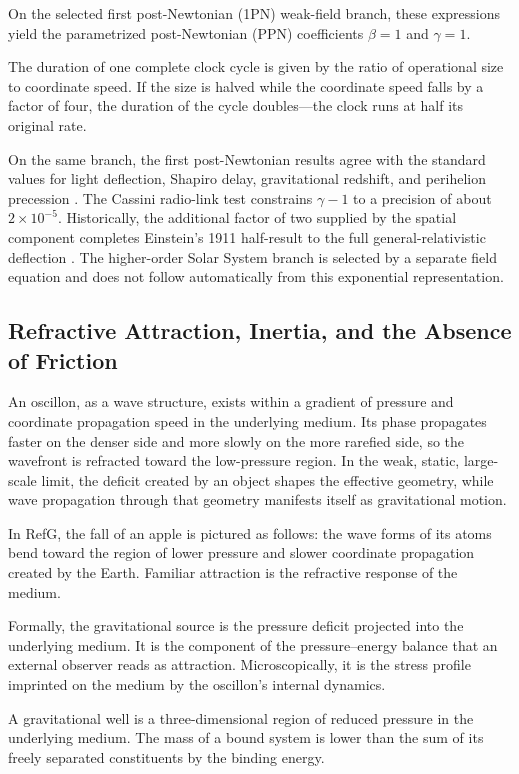 \documentclass[11pt,a4paper]{article}
\begin{document}
On the selected first post-Newtonian (1PN) weak-field branch, these expressions yield the parametrized post-Newtonian (PPN) coefficients $\beta=1$ and $\gamma=1$.

The duration of one complete clock cycle is given by the ratio of operational size to coordinate speed. If the size is halved while the coordinate speed falls by a factor of four, the duration of the cycle doubles---the clock runs at half its original rate.

On the same branch, the first post-Newtonian results agree with the standard values for light deflection, Shapiro delay, gravitational redshift, and perihelion precession \citep{bertotti2003,will2014}. The Cassini radio-link test constrains $\gamma-1$ to a precision of about $2\times10^{-5}$. Historically, the additional factor of two supplied by the spatial component completes Einstein's 1911 half-result to the full general-relativistic deflection \citep{einstein1916,shapiro1964}. The higher-order Solar System branch is selected by a separate field equation and does not follow automatically from this exponential representation.

\subsection{Refractive Attraction, Inertia, and the Absence of Friction}

An oscillon, as a wave structure, exists within a gradient of pressure and coordinate propagation speed in the underlying medium. Its phase propagates faster on the denser side and more slowly on the more rarefied side, so the wavefront is refracted toward the low-pressure region. In the weak, static, large-scale limit, the deficit created by an object shapes the effective geometry, while wave propagation through that geometry manifests itself as gravitational motion.

In RefG, the fall of an apple is pictured as follows: the wave forms of its atoms bend toward the region of lower pressure and slower coordinate propagation created by the Earth. Familiar attraction is the refractive response of the medium.

Formally, the gravitational source is the pressure deficit projected into the underlying medium. It is the component of the pressure--energy balance that an external observer reads as attraction. Microscopically, it is the stress profile imprinted on the medium by the oscillon's internal dynamics.

A gravitational well is a three-dimensional region of reduced pressure in the underlying medium. The mass of a bound system is lower than the sum of its freely separated constituents by the binding energy.
\end{document}
